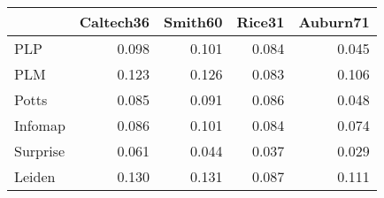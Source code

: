 \begin{tabular}{lrrrr}
\toprule
{} & Caltech36 & Smith60 & Rice31 & Auburn71 \\
\midrule
PLP      &     0.098 &   0.101 &  0.084 &    0.045 \\
PLM      &     0.123 &   0.126 &  0.083 &    0.106 \\
Potts    &     0.085 &   0.091 &  0.086 &    0.048 \\
Infomap  &     0.086 &   0.101 &  0.084 &    0.074 \\
Surprise &     0.061 &   0.044 &  0.037 &    0.029 \\
Leiden   &     0.130 &   0.131 &  0.087 &    0.111 \\
\bottomrule
\end{tabular}
